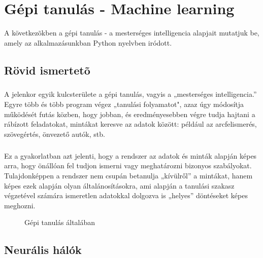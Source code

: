 \chapter{Gépi tanulás - Machine learning}\label{ch:MAT}

\begin{osszefoglal}
	A következõkben a gépi tanulás - a mesterséges intelligencia alapjait mutatjuk be, amely az alkalmazásunkban Python nyelvben iródott.
\end{osszefoglal}


\section{Rövid ismertetõ}\label{sec:MAT:bev}
\paragraph{}A jelenkor egyik kulcsterülete a gépi tanulás, vagyis a „mesterséges intelligencia.” Egyre több és több program végez „tanulási folyamatot", azaz úgy módosítja működését futás közben, hogy jobban, és eredményesebben végre tudja hajtani a rábízott feladatokat, mintákat keresve az adatok között: például az arcfelismerés, szövegértés, önvezető autók, stb. 
\paragraph{}Ez a gyakorlatban azt jelenti, hogy a rendszer az adatok és minták alapján képes arra, hogy önállóan fel tudjon ismerni vagy meghatározni bizonyos szabályokat. Tulajdonképpen a rendszer nem csupán betanulja „kívülről” a mintákat, hanem képes ezek alapján olyan általánosításokra, ami alapján a tanulási szakasz végzetével számára ismeretlen adatokkal dolgozva is „helyes” döntéseket képes meghozni.

\begin{figure}[t]
  \centering
  \caption[Gépi tanulás úgy általában]%
  {Gépi tanulás általában}
  \label{fig:ALAP:sm1}
\end{figure}



\section{Neurális hálók}\label{sec:MAT:bev}
